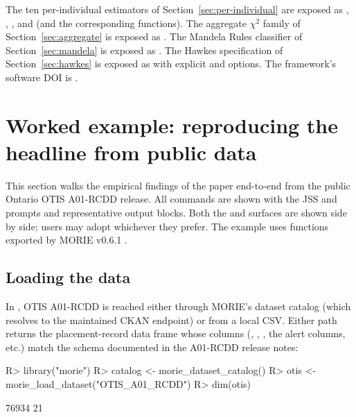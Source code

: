 \documentclass[article,shortnames,nojss]{jss}
\newcommand{\OTIS}{\textsf{OTIS}}
\begin{document}
The ten per-individual estimators of
Section~\ref{sec:per-individual} are exposed as
, ,
, and 
(and the corresponding  
functions). The aggregate $\chi^{2}$ family of
Section~\ref{sec:aggregate} is exposed as
. The Mandela Rules classifier of
Section~\ref{sec:mandela} is exposed as
. The Hawkes specification of
Section~\ref{sec:hawkes} is exposed as 
with explicit  and
 options. The framework's software
DOI is \citet{Ruhela2026MorieR}.

\section{Worked example: reproducing the headline from public data}
\label{sec:worked-example}

This section walks the empirical findings of the paper end-to-end
from the public Ontario \OTIS{} A01-RCDD release.  All commands
are shown with the JSS  and \code{>>>} prompts and
representative output blocks.  Both the  and
 surfaces are shown side by side; users may
adopt whichever they prefer.  The example uses functions
exported by MORIE v0.6.1
\citep{Ruhela2026MorieR, Ruhela2026MoriePy}.

\subsection{Loading the data}

In , OTIS A01-RCDD is reached either through MORIE's
dataset catalog (which resolves to the maintained CKAN endpoint)
or from a local CSV.  Either path returns the placement-record
data frame whose columns
(,
, ,
the alert columns, etc.) match the schema documented in the
A01-RCDD release notes:

\begin{CodeChunk}
\begin{CodeInput}
R> library("morie")
R> catalog <- morie_dataset_catalog()
R> otis    <- morie_load_dataset("OTIS_A01_RCDD")
R> dim(otis)
\end{CodeInput}
\begin{CodeOutput}
[1] 76934    21
\end{CodeOutput}
\end{CodeChunk}
\end{document}
